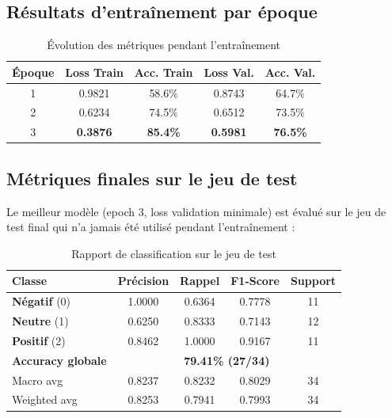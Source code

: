 \subsection{Résultats d'entraînement par époque}

\begin{table}[H]
\centering
\caption{Évolution des métriques pendant l'entraînement}
\label{tab:training_history}
\renewcommand{\arraystretch}{1.5}
\begin{tabular}{ccccc}
\toprule
\rowcolor{bleuprincipal!15}
\textbf{Époque} & \textbf{Loss Train} & \textbf{Acc. Train} &
\textbf{Loss Val.} & \textbf{Acc. Val.} \\
\midrule
1 & 0.9821 & 58.6\% & 0.8743 & 64.7\% \\
\rowcolor{gray!8}
2 & 0.6234 & 74.5\% & 0.6512 & 73.5\% \\
3 & \textbf{0.3876} & \textbf{85.4\%} & \textbf{0.5981} & \textbf{76.5\%} \\
\bottomrule
\end{tabular}
\end{table}

\subsection{Métriques finales sur le jeu de test}

Le meilleur modèle (epoch 3, loss validation minimale) est évalué sur
le jeu de test final qui n'a jamais été utilisé pendant l'entraînement :

\begin{table}[H]
\centering
\caption{Rapport de classification sur le jeu de test}
\label{tab:classification_report}
\renewcommand{\arraystretch}{1.5}
\begin{tabular}{lcccc}
\toprule
\rowcolor{bleuprincipal!15}
\textbf{Classe} & \textbf{Précision} & \textbf{Rappel} &
\textbf{F1-Score} & \textbf{Support} \\
\midrule
\textcolor{rougeprincipal}{\textbf{Négatif}} (0) & 1.0000 & 0.6364 & 0.7778 & 11 \\
\rowcolor{gray!8}
\textcolor{jauneneutre!70!black}{\textbf{Neutre}} (1) & 0.6250 & 0.8333 & 0.7143 & 12 \\
\textcolor{vertprincipal}{\textbf{Positif}} (2) & 0.8462 & 1.0000 & 0.9167 & 11 \\
\midrule
\rowcolor{bleuprincipal!8}
\textbf{Accuracy globale} & \multicolumn{4}{c}{\textbf{79.41\% (27/34)}} \\
\midrule
Macro avg & 0.8237 & 0.8232 & 0.8029 & 34 \\
\rowcolor{gray!8}
Weighted avg & 0.8253 & 0.7941 & 0.7993 & 34 \\
\bottomrule
\end{tabular}
\end{table}

